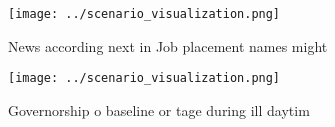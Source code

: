 \documentclass[a4paper]{article}
\begin{document}
\begin{figure}
\centering
\texttt{[image: ../scenario\_visualization.png]}
\caption{News according next in Job placement names might 
}
\end{figure}
 
\begin{figure}
\centering
\texttt{[image: ../scenario\_visualization.png]}
\caption{Governorship o baseline or tage during ill daytim
}
\end{figure}
 
\end{document}
